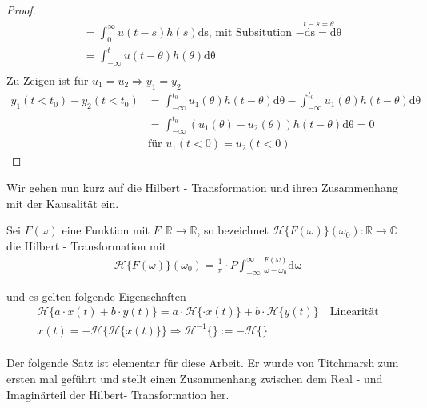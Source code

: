 \begin{satz}
\begin{proof}
\begin{align}
	&= \int_{0}^{\infty} u(t - s) h(s) \mathrm{ds} \text{, mit Subsitution } \stackrel{t - s = \theta}{-\mathrm{ds} = \mathrm{d\theta}}\\
	&= \int_{-\infty}^{t} u(t- \theta) h(\theta) \mathrm{d\theta}\\
\end{align}
Zu Zeigen ist für $u_1 = u_2  \Rightarrow  y_1 = y_2$ 
\begin{align}
	y_1(t < t_0) - y_2(t < t_0) &= \int_{-\infty}^{t_0} u_1(\theta) h(t-\theta) \mathrm{d\theta} - \int_{-\infty}^{t_0} u_1(\theta) h(t-\theta) \mathrm{d\theta} \\
	&= \int_{-\infty}^{t_0} \left(u_1(\theta) - u_2(\theta) \right) h(t-\theta) \mathrm{d\theta} = 0\\ &\text{für } u_1(t < 0) = u_2(t < 0)
\end{align} 
\end{proof}
\end{satz}
Wir gehen nun kurz auf die Hilbert - Transformation und ihren Zusammenhang mit der Kausalität ein.
\begin{defi}\label{ht}
Sei $F(\omega)$ eine Funktion mit $F: \mathbb{R} \rightarrow \mathbb{R}$, so bezeichnet $\mathscr{H}\{F(\omega)\}(\omega_0): \mathbb{R}\rightarrow \mathbb{C}$ die Hilbert - Transformation mit
\begin{align}
\mathscr{H}\{F(\omega)\}(\omega_0)= \frac{1}{\pi}\cdot P \int_{-\infty}^{\infty} \frac{F(\omega)}{\omega-\omega_0} \mathrm{d\omega}
\end{align}
\end{defi}
und es gelten folgende Eigenschaften
\begin{align}
	\mathscr{H}\{a \cdot x(t) + b \cdot y(t)\} = a \cdot \mathscr{H}\{\cdot x(t)\} + b \cdot \mathscr{H}\{y(t)\} \quad \text{Linearität}\\
	x(t) =-\mathscr{H}\{\mathscr{H}\{x(t)\}\} \Rightarrow \mathscr{H}^{-1}\{\}:= -\mathscr{H}\{\}
\end{align}
\cite[Seite 191]{Frey2009}\\

Der folgende Satz ist elementar für diese Arbeit. Er wurde von Titchmarsh \cite[Seite 125]{titch1948} zum ersten mal geführt und stellt einen Zusammenhang zwischen dem Real - und Imaginärteil der Hilbert- Transformation her. 

